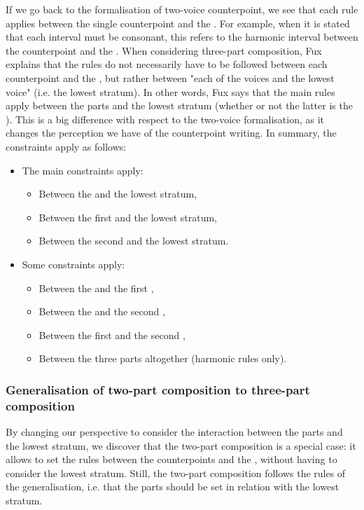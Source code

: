 If we go back to the formalisation of two-voice counterpoint, we see that each rule applies between the single counterpoint and the \cf. For example, when it is stated that each interval must be consonant, this refers to the harmonic interval between the counterpoint and the \cf.
When considering three-part composition, Fux explains that the rules do not necessarily have to be followed between each counterpoint and the \cf, but rather between "each of the voices and the lowest voice" (i.e. the lowest stratum). In other words, Fux says that the main rules apply between the parts and the lowest stratum (whether or not the latter is the \cf). This is a big difference with respect to the two-voice formalisation, as it changes the perception we have of the counterpoint writing.
In summary, the constraints apply as follows:
\begin{itemize}
    \item The main constraints apply:
    \begin{itemize}
        \item Between the \cfs and the lowest stratum,
        \item Between the first \cps and the lowest stratum,
        \item Between the second \cps and the lowest stratum.
    \end{itemize}
    \item Some constraints apply:
    \begin{itemize}
        \item Between the \cfs and the first \cp,
        \item Between the \cfs and the second \cp,
        \item Between the first \cps and the second \cp,
        \item Between the three parts altogether (harmonic rules only).
    \end{itemize}

\end{itemize}


\subsubsection{Generalisation of two-part composition to three-part composition}
By changing our perspective to consider the interaction between the parts and the lowest stratum, we discover that the two-part composition is a special case: it allows to set the rules between the counterpoints and the \cf, without having to consider the lowest stratum. Still, the two-part composition follows the rules of the generalisation, i.e. that the parts should be set in relation with the lowest stratum.

